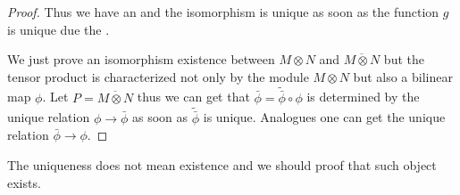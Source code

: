 \begin{lemma}
\begin{proof}
Thus we have an
 and the isomorphism is unique as soon as the
function $g$ is unique due the .

We just prove an isomorphism existence between
$M \otimes N$ and $\overline{M \otimes N}$ but the tensor product is
characterized not only by the module $M \otimes N$
but also a bilinear map $\phi$. Let $P = \overline{M \otimes N}$ thus
we can get that $\bar{\phi} = \tilde{\bar{\phi}} \circ \phi$ is
determined by the unique
relation $\phi \to \bar{\phi}$ as soon as
$\tilde{\bar{\phi}}$ is unique.
Analogues one can get the unique relation
$\bar{\phi} \to \phi$.
\end{proof}
\label{lem:universalpropertyuniqueness}
\end{lemma}

The uniqueness does not mean existence and we should proof that such
object exists.
